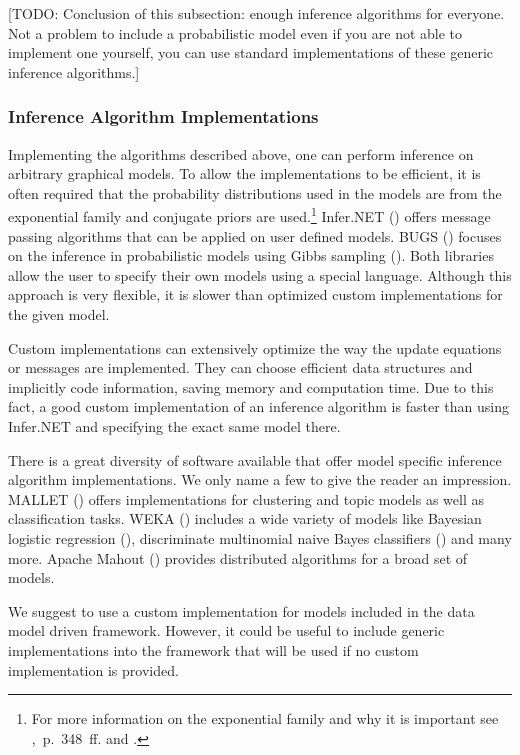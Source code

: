 [TODO: Conclusion of this subsection: enough inference algorithms for everyone. Not a problem to include a probabilistic model even if you are not able to implement one yourself, you can use standard implementations of these generic inference algorithms.]

\subsubsection{Inference Algorithm Implementations}
\label{subsec:custom-inference}

Implementing the algorithms described above, one can perform inference on arbitrary graphical models. To allow the implementations to be efficient, it is often required that the probability distributions used in the models are from the exponential family and conjugate priors are used.\footnote{For more information on the exponential family and why it is important see \textcite{murphy2012machine},~p.~348~ff. and \textcite{andersen1970sufficiency}.} Infer.NET (\cite{InferNET12}) offers message passing algorithms that can be applied on user defined models. BUGS (\cite{lunn2009bugs}) focuses on the inference in probabilistic models using Gibbs sampling (\cite{geman1984stochastic}). Both libraries allow the user to specify their own models using a special language. Although this approach is very flexible, it is slower than optimized custom implementations for the given model.

Custom implementations can extensively optimize the way the update equations or messages are implemented. They can choose efficient data structures and implicitly code information, saving memory and computation time. Due to this fact, a good custom implementation of an inference algorithm is faster than using Infer.NET and specifying the exact same model there.

There is a great diversity of software available that offer model specific inference algorithm implementations. We only name a few to give the reader an impression. MALLET (\cite{mccallum2002mallet}) offers implementations for clustering and topic models as well as classification tasks. WEKA (\cite{hall2009weka}) includes a wide variety of models like Bayesian logistic regression (\cite{genkin2007large}), discriminate multinomial naive Bayes classifiers (\cite{talia2005weka4ws}) and many more. Apache Mahout (\cite{mahout}) provides distributed algorithms for a broad set of models.

We suggest to use a custom implementation for models included in the data model driven framework. However, it could be useful to include generic implementations into the framework that will be used if no custom implementation is provided.
